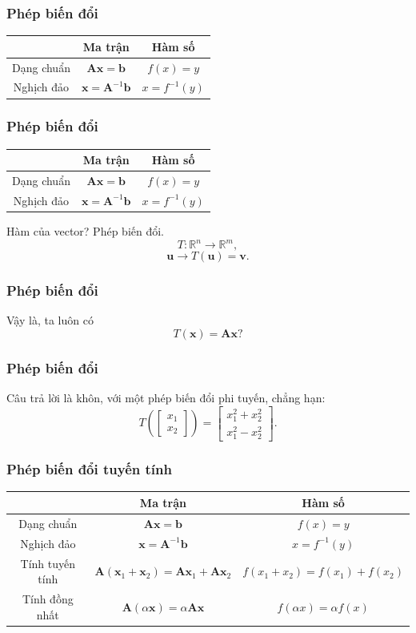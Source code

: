 \begin{frame}
    \frametitle{Phép biến đổi}
    \begin{center}
\begin{tabular}{|c|c|c|}
  \hline
   & Ma trận & Hàm số \\
  \hline
  Dạng chuẩn & \(\mathbf{A}\mathbf{x}=\mathbf{b}\) & \(f(x)=y\) \\
  \hline
   Nghịch đảo& \(\mathbf{x}=\mathbf{A}^{-1}\mathbf{b}\) & \(x=f^{-1}(y)\) \\
  \hline
\end{tabular}
\end{center}
\end{frame}
\begin{frame}
    \frametitle{Phép biến đổi}
    \begin{center}
\begin{tabular}{|c|c|c|}
  \hline
   & Ma trận & Hàm số \\
  \hline
  Dạng chuẩn & \(\mathbf{A}\mathbf{x}=\mathbf{b}\) & \(f(x)=y\) \\
  \hline
   Nghịch đảo& \(\mathbf{x}=\mathbf{A}^{-1}\mathbf{b}\) & \(x=f^{-1}(y)\) \\
  \hline
\end{tabular}
\end{center}
Hàm của vector? Phép biến đổi.
\[T: \mathbb{R}^n \rightarrow \mathbb{R}^m,\]
\[\mathbf{u}\rightarrow T(\mathbf{u})=\mathbf{v}.\]
\end{frame}
\begin{frame}
    \frametitle{Phép biến đổi}
    Vậy là, ta luôn có \[T(\mathbf{x})=\mathbf{A}\mathbf{x}?\]
\end{frame}
\begin{frame}
    \frametitle{Phép biến đổi}
    Câu trả lời là khôn, với một phép biến đổi phi tuyến, chẳng hạn:
    \[T\left(\begin{bmatrix}
    x_1\\x_2
\end{bmatrix}\right)=\begin{bmatrix}
    x_{1}^2 +x_{2}^2 \\x_{1}^2 -x_{2}^2
\end{bmatrix}.\]
\end{frame}
\begin{frame}
    \frametitle{Phép biến đổi tuyến tính}
    \begin{center}
\begin{tabular}{|c|c|c|}
  \hline
   & Ma trận & Hàm số \\
  \hline
  Dạng chuẩn & \(\mathbf{A}\mathbf{x}=\mathbf{b}\) & \(f(x)=y\) \\
  \hline
   Nghịch đảo& \(\mathbf{x}=\mathbf{A}^{-1}\mathbf{b}\) & \(x=f^{-1}(y)\) \\
  \hline
  Tính tuyến tính & \(\mathbf{A}(\mathbf{x}_1+\mathbf{x}_2)=\mathbf{A}\mathbf{x}_1 +\mathbf{A}\mathbf{x}_2\) &\(f(x_1 +x_2)=f(x_1)+f(x_2)\)\\
  Tính đồng nhất & \(\mathbf{A}(\alpha\mathbf{x})=\alpha\mathbf{A}\mathbf{x}\)&\(f(\alpha x)=\alpha f(x)\)\\
  \hline
\end{tabular}
\end{center}
\end{frame}
